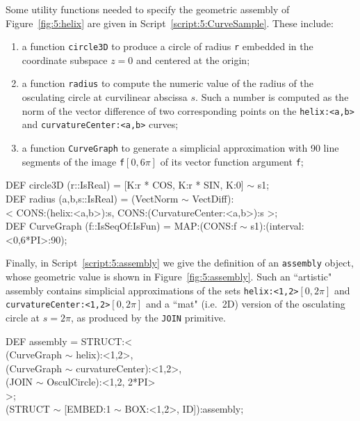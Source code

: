 \documentclass{31x47jw}
\begin{document}
Some utility functions needed to specify the geometric assembly of
Figure~\ref{fig:5:helix} are given in
Script~\ref{script:5:CurveSample}. These include:
\begin{enumerate}
    
\item a function \texttt{circle3D} to produce a circle of radius
\texttt{r} embedded in the coordinate subspace $z=0$ and centered at
the origin; 

\item a function \texttt{radius} to compute the numeric value of the
radius of the osculating circle at curvilinear abscissa $s$.  Such
a number is computed as the norm of the vector difference of two
corresponding points on the \texttt{helix:<a,b>} and
\texttt{curvatureCenter:<a,b>} curves;

\item a function \texttt{CurveGraph} to generate a simplicial
approximation with 90 line segments of the image \texttt{f$[0,6\pi]$}
of its vector function argument \texttt{f};

\end{enumerate}

\begin{script}
\begin{smallplasm}
DEF circle3D (r::IsReal) = [K:r * COS, K:r * SIN, K:0] $\sim$ s1;\\
DEF radius (a,b,s::IsReal) = (VectNorm $\sim$ VectDiff):\+\\
  < CONS:(helix:<a,b>):s, CONS:(CurvatureCenter:<a,b>):s >;\-\\
DEF CurveGraph (f::IsSeqOf:IsFun) = MAP:(CONS:f  $\sim$ s1):(interval:<0,6*PI>:90);
\end{smallplasm}
\label{script:5:CurveSample}
\end{script}

Finally, in Script~\ref{script:5:assembly} we give the definition of
an \texttt{assembly} object, whose geometric value is shown in
Figure~\ref{fig:5:assembly}.  Such an ``artistic" assembly contains
simplicial approximations of the sets \texttt{helix:<1,2>$[0,2\pi]$}
and \texttt{curvatureCenter:<1,2>$[0,2\pi]$} and a ``mat" (i.e.~2D)
version of the osculating circle at $s=2\pi$, as produced by the
\texttt{JOIN} primitive.

\begin{script}
\begin{smallplasm}
DEF assembly = STRUCT:<\+\\
  (CurveGraph $\sim$ helix):<1,2>,\\
  (CurveGraph $\sim$ curvatureCenter):<1,2>,\\
  (JOIN $\sim$ OsculCircle):<1,2, 2*PI>\-\\
>;\\[0.3cm]

(STRUCT $\sim$ [EMBED:1 $\sim$ BOX:<1,2>, ID]):assembly;
\end{smallplasm}
\label{script:5:assembly}
\end{script}
\end{document}
